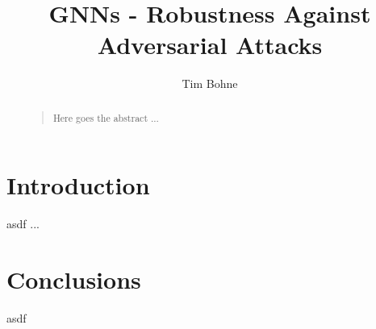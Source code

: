 \documentclass[a4paper,preprint]{sig-alternate}
\begin{document}
\title{GNNs - Robustness Against Adversarial Attacks}


%
\author{
%
\alignauthor Tim Bohne\\
}



\maketitle

\begin{abstract}
\begin{quote}
Here goes the abstract ... 
\end{quote}
\end{abstract}

\section{Introduction}
asdf ...



\blinddocument

\section{Conclusions}
asdf



\end{document}
